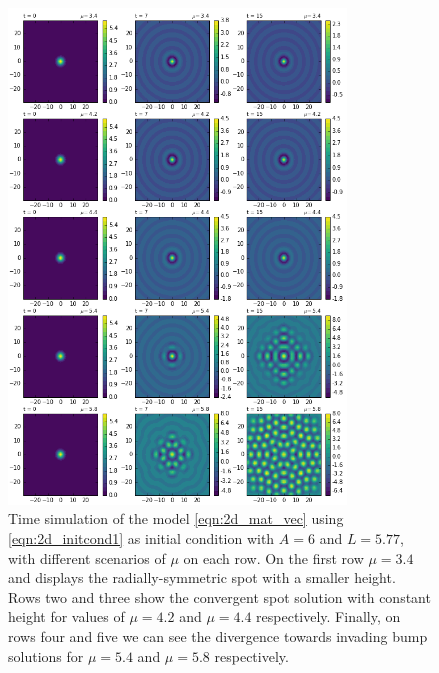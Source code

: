 \documentclass{uonmathreport}
\begin{document}
\begin{figure}[H]
	\begin{center}
	\includegraphics[width=0.8\textwidth]{Figures/2dRect_IC1_3249points.png}
	\end{center}
	\caption{Time simulation of the model \ref{eqn:2d_mat_vec} using \ref{eqn:2d_initcond1} as initial condition with $A = 6$ and $L = 5.77$, with different scenarios of $\mu$ on each row. On the first row $\mu = 3.4$ and displays the radially-symmetric spot with a smaller height. Rows two and three show the convergent spot solution with constant height for values of $\mu = 4.2$ and $\mu = 4.4$ respectively. Finally, on rows four and five we can see the divergence towards invading bump solutions for $\mu=5.4$ and $\mu=5.8$ respectively.}
	\label{fig:2dRect_IC1}
\end{figure}
\end{document}
